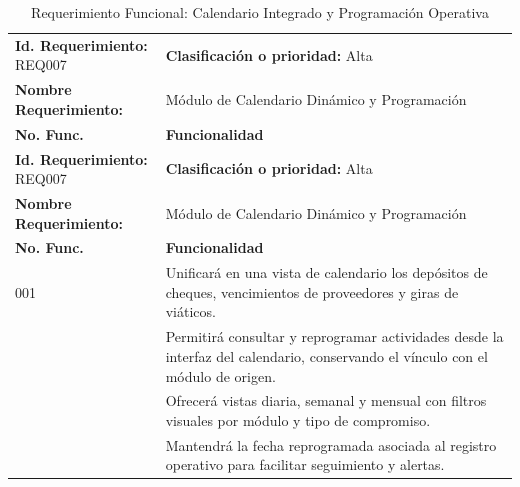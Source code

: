 {
\small
{}
\setlength{\parindent}{0pt}
\begin{xltabular}{\linewidth}{
    >{\raggedright\arraybackslash}p{4.2cm} 
    >{\raggedright\arraybackslash}X
}

    \caption{Requerimiento Funcional: Calendario Integrado y Programación Operativa} \label{tab:req007_calendario} \\
    \toprule
    \textbf{Id. Requerimiento:} REQ007 & \textbf{Clasificación o prioridad:} Alta \\
    \textbf{Nombre Requerimiento:} & Módulo de Calendario Dinámico y Programación \\
    \textbf{No. Func.} & \textbf{Funcionalidad} \\
    \midrule
    \endfirsthead

    \toprule
    \textbf{Id. Requerimiento:} REQ007 & \textbf{Clasificación o prioridad:} Alta \\
    \textbf{Nombre Requerimiento:} & Módulo de Calendario Dinámico y Programación \\
    \textbf{No. Func.} & \textbf{Funcionalidad} \\
    \midrule
    \endhead

    \endfoot

    \bottomrule
\endlastfoot

    001 & Unificará en una vista de calendario los depósitos de cheques, vencimientos de proveedores y giras de viáticos. \\
     & Permitirá consultar y reprogramar actividades desde la interfaz del calendario, conservando el vínculo con el módulo de origen. \\
     & Ofrecerá vistas diaria, semanal y mensual con filtros visuales por módulo y tipo de compromiso. \\
     & Mantendrá la fecha reprogramada asociada al registro operativo para facilitar seguimiento y alertas. \\
\end{xltabular}
}

